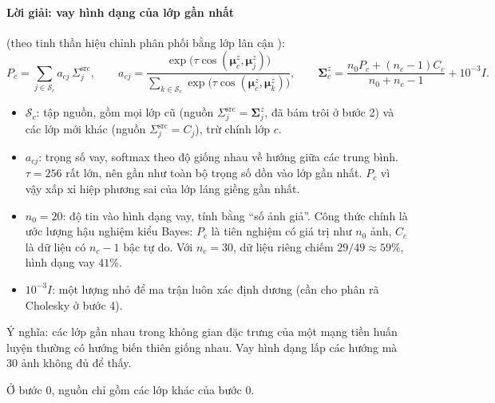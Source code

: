 \documentclass[11pt]{article}
\newcommand{\bmu}{\boldsymbol{\mu}}
\newcommand{\bSigma}{\boldsymbol{\Sigma}}
\newcommand{\muz}{\bmu^{z}}
\newcommand{\Sz}{\bSigma^{z}}
\begin{document}
\paragraph{Lời giải: vay hình dạng của lớp gần nhất} (theo tinh thần hiệu chỉnh phân phối bằng lớp lân cận
\cite{freelunch}):
\begin{equation}\label{eq:borrow}
P_c=\sum_{j\in\mathcal S_c}a_{cj}\,\Sigma^{\text{src}}_j,\qquad
a_{cj}=\frac{\exp\big(\tau\cos(\muz_c,\muz_j)\big)}{\sum_{k\in\mathcal S_c}\exp\big(\tau\cos(\muz_c,\muz_k)\big)},\qquad
\Sz_c=\frac{n_0P_c+(n_c-1)C_c}{n_0+n_c-1}+10^{-3}I .
\end{equation}
\begin{itemize}
\item $\mathcal S_c$: tập nguồn, gồm mọi lớp cũ (nguồn $\Sigma^{\text{src}}_j=\Sz_j$, đã bám trôi ở bước 2) và các lớp
      mới khác (nguồn $\Sigma^{\text{src}}_j=C_j$), trừ chính lớp $c$.
\item $a_{cj}$: trọng số vay, softmax theo độ giống nhau về hướng giữa các trung bình. $\tau=256$ rất lớn, nên gần như
      toàn bộ trọng số dồn vào lớp gần nhất. $P_c$ vì vậy xấp xỉ hiệp phương sai của lớp láng giềng gần nhất.
\item $n_0=20$: độ tin vào hình dạng vay, tính bằng ``số ảnh giả''. Công thức chính là ước lượng hậu nghiệm kiểu Bayes:
      $P_c$ là tiên nghiệm có giá trị như $n_0$ ảnh, $C_c$ là dữ liệu có $n_c-1$ bậc tự do. Với $n_c=30$, dữ liệu riêng
      chiếm $29/49\approx59\%$, hình dạng vay $41\%$.
\item $10^{-3}I$: một lượng nhỏ để ma trận luôn xác định dương (cần cho phân rã Cholesky ở bước 4).
\end{itemize}
Ý nghĩa: các lớp gần nhau trong không gian đặc trưng của một mạng tiền huấn luyện thường có hướng biến thiên giống nhau.
Vay hình dạng lấp các hướng mà 30 ảnh không đủ để thấy.

Ở bước 0, nguồn chỉ gồm các lớp khác của bước 0.
\end{document}
